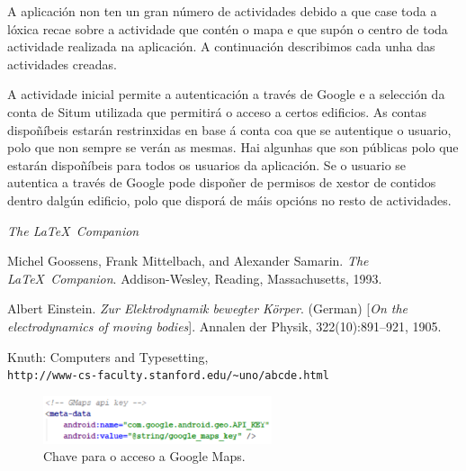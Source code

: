 A aplicación non ten un gran número de actividades debido a que case toda a lóxica recae sobre a actividade que contén o mapa e que supón o centro de toda actividade realizada na aplicación. A continuación describimos cada unha das actividades creadas.


A actividade inicial permite a autenticación a través de Google e a selección da conta de Situm utilizada que permitirá o acceso a certos edificios. As contas dispoñíbeis estarán restrinxidas en base á conta coa que se autentique o usuario, polo que non sempre se verán as mesmas. Hai algunhas que son públicas polo que estarán dispoñíbeis para todos os usuarios da aplicación. Se o usuario se autentica a través de Google pode dispoñer de permisos de xestor de contidos dentro dalgún edificio, polo que disporá de máis opcións no resto de actividades.

\textit{The \LaTeX\ Companion}
\cite{latexcompanion}

\begin{thebibliography}{9}
	Michel Goossens, Frank Mittelbach, and Alexander Samarin. 
	\textit{The \LaTeX\ Companion}. 
	Addison-Wesley, Reading, Massachusetts, 1993.
	
	Albert Einstein. 
	\textit{Zur Elektrodynamik bewegter K{\"o}rper}. (German) 
	[\textit{On the electrodynamics of moving bodies}]. 
	Annalen der Physik, 322(10):891–921, 1905.
	
	Knuth: Computers and Typesetting,
	\\\texttt{http://www-cs-faculty.stanford.edu/\~{}uno/abcde.html}
\end{thebibliography}


\begin{figure}[h]
	\begin{center}
		\includegraphics[width=0.6\textwidth]{figures/codigo/chaveGoogleMaps}
		\caption{Chave para o acceso a Google Maps.}
		\label{fig:chaveGoogleMaps}
	\end{center}
\end{figure}

